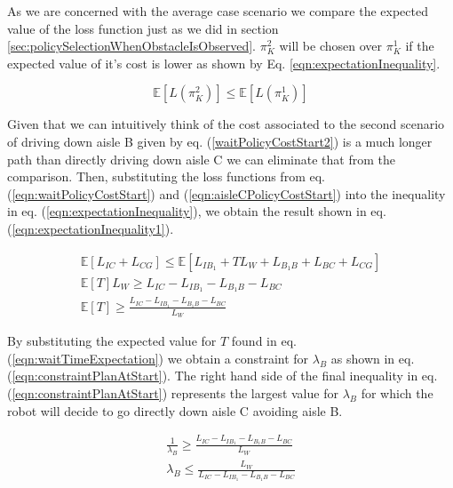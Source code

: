 \documentclass[a4paper,12pt]{article}
\begin{document}
			As we are concerned with the average case scenario we compare the expected value of the loss function just as we did in section \ref{sec:policySelectionWhenObstacleIsObserved}. $\pi_{K}^{2}$ will be chosen over $\pi_{K}^{1}$ if the expected value of it's cost is lower as shown by Eq. \ref{eqn:expectationInequality}.
			
			\begin{equation}
			\mathbb{E}\left[L\left(\pi_{K}^{2}\right)\right] \leq \mathbb{E}\left[L\left(\pi_{K}^{1}\right)\right]
			\label{eqn:expectationInequality}
			\end{equation}
			
			Given that we can intuitively think of the cost associated to the second scenario of driving down aisle B given by eq. (\ref{waitPolicyCostStart2}) is a much longer path than directly driving down aisle C we can eliminate that from the comparison. Then, substituting the loss functions from eq. (\ref{eqn:waitPolicyCostStart}) and (\ref{eqn:aisleCPolicyCostStart}) into the inequality in eq. (\ref{eqn:expectationInequality}), we obtain the result shown in eq. (\ref{eqn:expectationInequality1}).
			
			\begin{equation}
			\begin{split}
			\mathbb{E}[L_{IC}+L_{CG}] \leq \mathbb{E}[L_{IB_1}+TL_W + L_{B_1B}+L_{BC}+L_{CG}] \\
			\mathbb{E}[T]L_W \geq L_{IC}-L_{IB_1}-L_{B_1B}-L_{BC}\\
			\mathbb{E}[T] \geq \frac{L_{IC}-L_{IB_1}-L_{B_1B}-L_{BC}}{L_W}
			\end{split}
			\label{eqn:expectationInequality1}
			\end{equation}
			
			
			
			By substituting the expected value for $T$ found in eq. (\ref{eqn:waitTimeExpectation}) we obtain a constraint for $\lambda_B$ as shown in eq. (\ref{eqn:constraintPlanAtStart}). The right hand side of the final inequality in eq. (\ref{eqn:constraintPlanAtStart}) represents the largest value for $\lambda_B$ for which the robot will decide to go directly down aisle C avoiding aisle B. 
			
			\begin{equation}
			\begin{split}
			\frac{1}{\lambda_B} \geq \frac{L_{IC}-L_{IB_1}-L_{B_1B}-L_{BC}}{L_W}\\
			\lambda_B \leq \frac{L_W}{L_{IC}-L_{IB_1}-L_{B_1B}-L_{BC}}
			\end{split}
			\label{eqn:constraintPlanAtStart}
			\end{equation}
\end{document}
